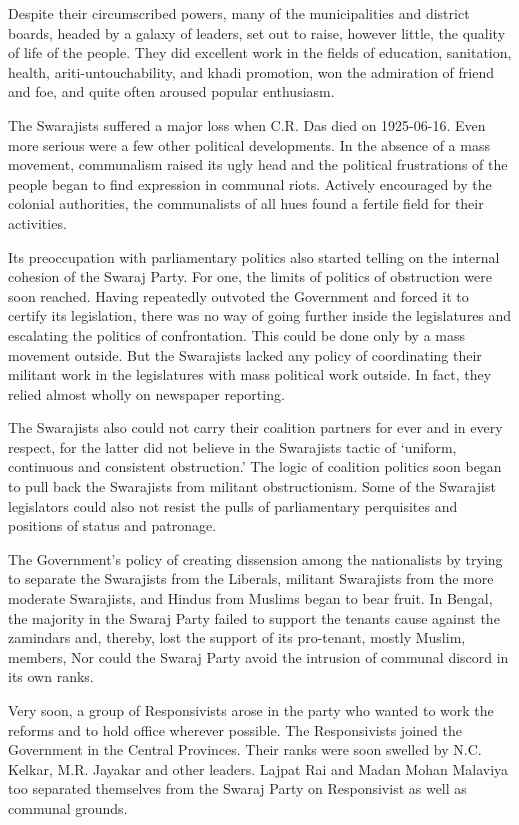 \begin{multicols}{2}
Despite their circumscribed powers, many of the municipalities and district boards, headed by a galaxy of leaders, set out to raise, however little, the quality of life of the people. They did excellent work in the fields of education, sanitation, health, ariti-untouchability, and khadi promotion, won the admiration of friend and foe, and quite often aroused popular enthusiasm.

The Swarajists suffered a major loss when C.R. Das died on 1925-06-16. Even more serious were a few other political developments. In the absence of a mass movement, communalism raised its ugly head and the political frustrations of the people began to find expression in communal riots. Actively encouraged by the colonial authorities, the communalists of all hues found a fertile field for their activities.

Its preoccupation with parliamentary politics also started telling on the internal cohesion of the Swaraj Party. For one, the limits of politics of obstruction were soon reached. Having repeatedly outvoted the Government and forced it to certify its legislation, there was no way of going further inside the legislatures and escalating the politics of confrontation. This could be done only by a mass movement outside. But the Swarajists lacked any policy of coordinating their militant work in the legislatures with mass political work outside. In fact, they relied almost wholly on newspaper reporting.

The Swarajists also could not carry their coalition partners for ever and in every respect, for the latter did not believe in the Swarajists tactic of `uniform, continuous and consistent obstruction.' The logic of coalition politics soon began to pull back the Swarajists from militant obstructionism. Some of the Swarajist legislators could also not resist the pulls of parliamentary perquisites and positions of status and patronage.

The Government's policy of creating dissension among the nationalists by trying to separate the Swarajists from the Liberals, militant Swarajists from the more moderate Swarajists, and Hindus from Muslims began to bear fruit. In Bengal, the majority in the Swaraj Party failed to support the tenants cause against the zamindars and, thereby, lost the support of its pro-tenant, mostly Muslim, members, Nor could the Swaraj Party avoid the intrusion of communal discord in its own ranks.

Very soon, a group of Responsivists arose in the party who wanted to work the reforms and to hold office wherever possible. The Responsivists joined the Government in the Central Provinces. Their ranks were soon swelled by N.C. Kelkar, M.R. Jayakar and other leaders. Lajpat Rai and Madan Mohan Malaviya too separated themselves from the Swaraj Party on Responsivist as well as communal grounds.


\end{multicols}
